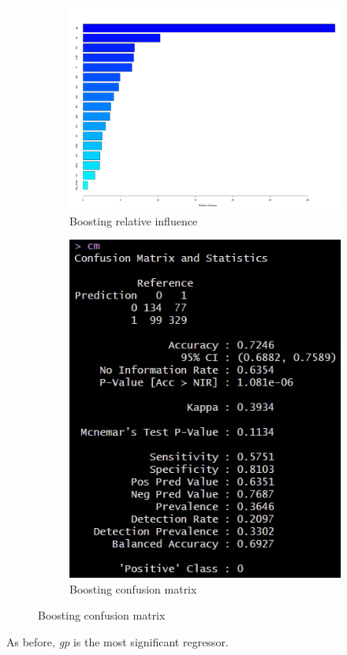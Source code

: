 \begin{figure}[H]
	\centering
	\begin{subfigure}{.5\textwidth}
		\centering
		\includegraphics[width=0.6\linewidth]{ImageFiles/Classification/Trees/boost_4_rel_inf}
		\caption{Boosting relative influence}
		\label{fig:boost_4_rel_inf}
	\end{subfigure}%
	\hfill
	\begin{subfigure}{.5\textwidth}
		\centering
		\includegraphics[width=0.4\linewidth]{ImageFiles/Classification/Trees/boost_4_conf_mat}
		\caption{Boosting confusion matrix}
		\label{fig:boost_4_conf_mat}
	\end{subfigure}
\end{figure}

As before, \textit{gp} is the most significant regressor.

